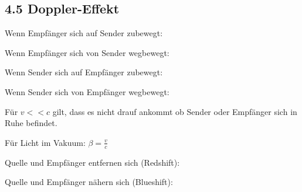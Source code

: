 \subsection{4.5 Doppler-Effekt}
    
    Wenn Empfänger sich auf Sender zubewegt:

    Wenn Empfänger sich von Sender wegbewegt:

    Wenn Sender sich auf Empfänger zubewegt:

    Wenn Sender sich von Empfänger wegbewegt:

    Für $v << c$ gilt, dass es nicht drauf ankommt ob Sender oder Empfänger sich in Ruhe befindet.

    Für Licht im Vakuum:
    $\beta = \frac{v}{c}$

    Quelle und Empfänger entfernen sich (Redshift):

    Quelle und Empfänger nähern sich (Blueshift):
